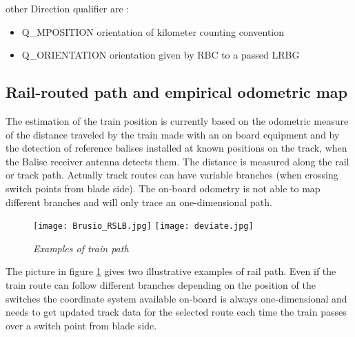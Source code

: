 other Direction qualifier are :
\begin{itemize}
\item Q\_MPOSITION orientation of kilometer counting convention
\item Q\_ORIENTATION orientation given by RBC to a passed LRBG
\end{itemize}

\clearpage

\subsection{Rail-routed path and empirical odometric map}
The estimation of the train position is currently based on the odometric measure of the distance traveled by the train made with an on board equipment and by the detection of reference balises installed at known positions on the track, when the Balise receiver antenna detects them. 
The distance is measured along the rail or track path. Actually track routes can have variable branches (when crossing switch points from blade side). The on-board odometry is not able to map different branches and will only trace an one-dimensional path.

\begin{figure}[!ht]
\centerline{
\texttt{[image: Brusio\_RSLB.jpg]}
\texttt{[image: deviate.jpg]}
}
\caption{\emph{Examples of train path}}
\label {fig:trainpath}
\end{figure}
The picture in figure \ref{fig:trainpath} gives two illustrative examples of rail path.
Even if the train route can follow different branches depending on the position of the switches the coordinate system available on-board is always one-dimensional and needs to get updated track data for the selected route each time the train passes over a switch point from blade side. 

